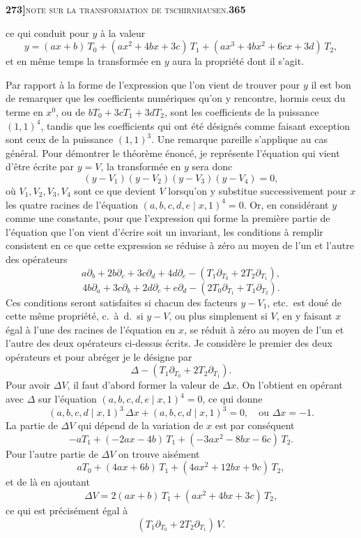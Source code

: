 \documentclass[11pt]{article}
\newcommand{\Cdel}{\mid}
\begin{document}
\newpage
\noindent\textbf{273]}\hfill\textsc{note sur la transformation de tschirnhausen.}\hfill\textbf{365}

\medskip

\noindent ce qui conduit pour $y$ \`a la valeur
\[
y = (a x + b)\, T_0 + (a x^2 + 4 b x + 3 c)\, T_1 + (a x^3 + 4 b x^2 + 6 c x + 3 d)\, T_2,
\]
et en m\^eme temps la transform\'ee en $y$ aura la propri\'et\'e dont il s'agit.

\medskip

Par rapport \`a la forme de l'expression que l'on vient de trouver pour $y$ il est bon de remarquer que les coefficients num\'eriques qu'on y rencontre, hormis ceux du terme en $x^0$, ou de $b T_0 + 3 c T_1 + 3 d T_2$, sont les coefficients de la puissance $(1, 1)^4$, tandis que les coefficients qui ont \'et\'e d\'esign\'es comme faisant exception sont ceux de la puissance $(1, 1)^3$. Une remarque pareille s'applique au cas g\'en\'eral. Pour d\'emontrer le th\'eor\`eme \'enonc\'e, je repr\'esente l'\'equation qui vient d'\^etre \'ecrite par $y = V$, la transform\'ee en $y$ sera donc
\[
(y - V_1)(y - V_2)(y - V_3)(y - V_4) = 0,
\]
o\`u $V_1, V_2, V_3, V_4$ sont ce que devient $V$ lorsqu'on y substitue successivement pour $x$ les quatre racines de l'\'equation $(a, b, c, d, e \Cdel x, 1)^4 = 0$. Or, en consid\'erant $y$ comme une constante, pour que l'expression qui forme la premi\`ere partie de l'\'equation que l'on vient d'\'ecrire soit un invariant, les conditions \`a remplir consistent en ce que cette expression se r\'eduise \`a z\'ero au moyen de l'un et l'autre des op\'erateurs
\[
a \partial_b + 2 b \partial_c + 3 c \partial_d + 4 d \partial_e - (T_1 \partial_{T_0} + 2 T_2 \partial_{T_1}),
\]
\[
4 b \partial_a + 3 c \partial_b + 2 d \partial_c + e \partial_d - (2 T_0 \partial_{T_1} + T_1 \partial_{T_2}).
\]
Ces conditions seront satisfaites si chacun des facteurs $y - V_1$, etc.\ est dou\'e de cette m\^eme propri\'et\'e, c.~\`a~d.\ si $y - V$, ou plus simplement si $V$, en y faisant $x$ \'egal \`a l'une des racines de l'\'equation en $x$, se r\'eduit \`a z\'ero au moyen de l'un et l'autre des deux op\'erateurs ci-dessus \'ecrits. Je consid\`ere le premier des deux op\'erateurs et pour abr\'eger je le d\'esigne par
\[
\Delta - (T_1 \partial_{T_0} + 2 T_2 \partial_{T_1}).
\]
Pour avoir $\Delta V$, il faut d'abord former la valeur de $\Delta x$. On l'obtient en op\'erant avec $\Delta$ sur l'\'equation $(a, b, c, d, e \Cdel x, 1)^4 = 0$, ce qui donne
\[
(a, b, c, d \Cdel x, 1)^3\, \Delta x + (a, b, c, d \Cdel x, 1)^3 = 0,\quad \text{ou } \Delta x = -1.
\]
La partie de $\Delta V$ qui d\'epend de la variation de $x$ est par cons\'equent
\[
-a T_1 + (-2 a x - 4 b)\, T_1 + (-3 a x^2 - 8 b x - 6 c)\, T_2.
\]
Pour l'autre partie de $\Delta V$ on trouve ais\'ement
\[
a T_0 + (4 a x + 6 b)\, T_1 + (4 a x^2 + 12 b x + 9 c)\, T_2,
\]
et de l\`a en ajoutant
\[
\Delta V = 2(a x + b)\, T_1 + (a x^2 + 4 b x + 3 c)\, T_2,
\]
ce qui est pr\'ecis\'ement \'egal \`a
\[
(T_1 \partial_{T_0} + 2 T_2 \partial_{T_1})\, V.
\]
\end{document}
